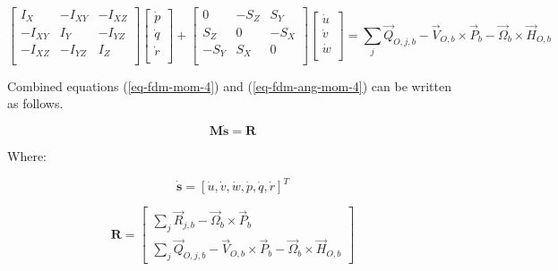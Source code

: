 \begin{equation}
  \label{eq-fdm-ang-mom-4}
  \left[
    \begin{matrix}
       I_X    & -I_{XY} & -I_{XZ} \\
      -I_{XY} &  I_Y    & -I_{YZ} \\
      -I_{XZ} & -I_{YZ} &  I_Z    \\
    \end{matrix}
  \right]
  \left[
    \begin{matrix}
      \dot p \\
      \dot q \\
      \dot r \\
    \end{matrix}
  \right]
  +
  \left[
    \begin{matrix}
         0 & -S_Z &  S_Y \\
       S_Z &    0 & -S_X \\
      -S_Y &  S_X &    0 \\
    \end{matrix}
  \right]
  \left[
    \begin{matrix}
      \dot u \\
      \dot v \\
      \dot w \\
    \end{matrix}
  \right]
  =
  \sum_j {\vec Q}_{O,j,b}
  -
  {\vec V}_{O,b} \times {\vec P}_b
  -
  {\vec \Omega}_b \times {\vec H}_{O,b}
\end{equation}

Combined equations (\ref{eq-fdm-mom-4}) and (\ref{eq-fdm-ang-mom-4}) can be written as follows. \cite{Sibilski2004}

\begin{equation}
  \label{eq-fdm-motion-1}
  \boldsymbol M \dot {\boldsymbol s} = \boldsymbol R
\end{equation}

Where:

\begin{equation}
  \dot {\boldsymbol s}
  =
  \left[ \dot u, \dot v, \dot w, \dot p, \dot q, \dot r \right]^T
\end{equation}

\begin{equation}
  {\boldsymbol R}
  =
  \left[
    \begin{array}{c}
      \sum_{j} {\vec R}_{j,b} - {\vec \Omega}_b \times {\vec P}_b \\
      \sum_{j} {\vec Q}_{O,j,b} - {\vec V}_{O,b} \times {\vec P}_b - {\vec \Omega}_b \times {\vec H}_{O,b}
    \end{array}
  \right]
\end{equation}

